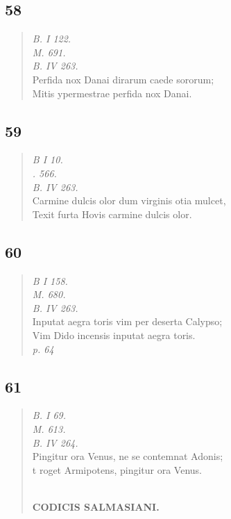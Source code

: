 \documentclass[11pt, a4paper]{report}
\begin{document}
            \subsection*{58}
      \begin{verse}
      \textit{B. I 122.} \\ \textit{M. 691.} \\ \textit{B. IV 263.} \\ Perfida nox Danai dirarum caede sororum; \\ Mitis ypermestrae perfida nox Danai. \\ 
      \end{verse}
  
            \subsection*{59}
      \begin{verse}
      \textit{B I 10.} \\ \textit{. 566.} \\ \textit{B. IV 263.} \\ Carmine dulcis olor dum virginis otia mulcet, \\ Texit furta Hovis carmine dulcis olor. \\ 
      \end{verse}
  
            \subsection*{60}
      \begin{verse}
      \textit{B I 158.} \\ \textit{M. 680.} \\ \textit{B. IV 263.} \\ Inputat aegra toris vim per deserta Calypso; \\ Vim Dido incensis inputat aegra toris. \\ \textit{p. 64} \\ 
      \end{verse}
  
            \subsection*{61}
      \begin{verse}
      \textit{B. I 69.} \\ \textit{M. 613.} \\ \textit{B. IV 264.} \\ Pingitur ora Venus, ne se contemnat Adonis; \\ t roget Armipotens, pingitur ora Venus. \\ 
        ﻿\pagebreak 
    \begin{center} \textbf{CODICIS SALMASIANI.} \end{center} \marginpar{[107]} 
      \end{verse}
  
\end{document}
